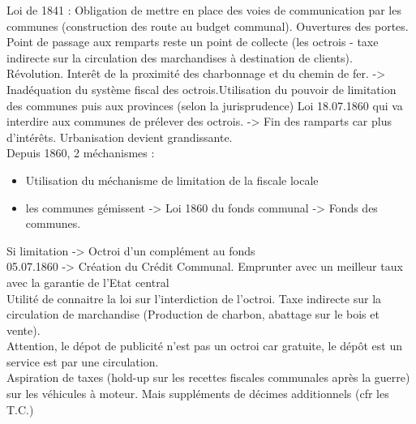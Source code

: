 \documentclass{book}
\begin{document}
\null


Loi de 1841 : Obligation de mettre en place des voies de communication par les communes (construction des route au budget communal). Ouvertures des portes. Point de passage aux remparts reste un point de collecte (les octrois - taxe indirecte sur la circulation des marchandises à destination de clients).\\

Révolution. Interêt de la proximité des charbonnage et du chemin de fer. -> Inadéquation du système fiscal des octrois.Utilisation du pouvoir de limitation des communes puis aux provinces (selon la jurisprudence) Loi 18.07.1860 qui va interdire aux communes de prélever des octrois. -> Fin des ramparts car plus d'intérêts. Urbanisation devient grandissante. \\

Depuis 1860, 2 méchanismes :\\


\begin{itemize}
\item Utilisation du méchanisme de limitation de la fiscale locale
\item les communes gémissent -> Loi 1860 du fonds communal -> Fonds des communes. 
\end{itemize}
\null

Si limitation -> Octroi d'un complément au fonds\\

05.07.1860 -> Création du Crédit Communal. Emprunter avec un meilleur taux avec la garantie de l'Etat central\\

Utilité de connaitre la loi sur l'interdiction de l'octroi. Taxe indirecte sur la circulation de marchandise (Production de charbon, abattage sur le bois et vente).\\

Attention, le dépot de publicité n'est pas un octroi car gratuite, le dépôt est un service est par une circulation.\\

Aspiration de taxes (hold-up sur les recettes fiscales communales après la guerre) sur les véhicules à moteur. Mais suppléments de décimes additionnels (cfr les T.C.)\\




















\nocite{*}

\end{document}
